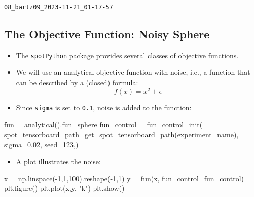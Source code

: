 \documentclass[
  letterpaper,
  DIV=11,
  numbers=noendperiod]{scrreprt}
\newenvironment{Shaded}{\begin{snugshade}}{\end{snugshade}}
\newcommand{\DecValTok}[1]{\textcolor[rgb]{0.68,0.00,0.00}{#1}}
\newcommand{\FloatTok}[1]{\textcolor[rgb]{0.68,0.00,0.00}{#1}}
\newcommand{\NormalTok}[1]{\textcolor[rgb]{0.00,0.23,0.31}{#1}}
\newcommand{\OperatorTok}[1]{\textcolor[rgb]{0.37,0.37,0.37}{#1}}
\newcommand{\StringTok}[1]{\textcolor[rgb]{0.13,0.47,0.30}{#1}}
\providecommand{\tightlist}{%
  \setlength{\itemsep}{0pt}\setlength{\parskip}{0pt}}\usepackage{longtable,booktabs,array}
\begin{document}
\begin{verbatim}
08_bartz09_2023-11-21_01-17-57
\end{verbatim}

\hypertarget{the-objective-function-noisy-sphere}{%
\subsection{The Objective Function: Noisy
Sphere}\label{the-objective-function-noisy-sphere}}

\begin{itemize}
\item
  The \texttt{spotPython} package provides several classes of objective
  functions.
\item
  We will use an analytical objective function with noise, i.e., a
  function that can be described by a (closed) formula:
  \[f(x) = x^2 + \epsilon\]
\item
  Since \texttt{sigma} is set to \texttt{0.1}, noise is added to the
  function:
\end{itemize}

\begin{Shaded}
\begin{Highlighting}[]
\NormalTok{fun }\OperatorTok{=}\NormalTok{ analytical().fun\_sphere}
\NormalTok{fun\_control }\OperatorTok{=}\NormalTok{ fun\_control\_init(}
\NormalTok{    spot\_tensorboard\_path}\OperatorTok{=}\NormalTok{get\_spot\_tensorboard\_path(experiment\_name),}
\NormalTok{    sigma}\OperatorTok{=}\FloatTok{0.02}\NormalTok{,}
\NormalTok{    seed}\OperatorTok{=}\DecValTok{123}\NormalTok{,)}
\end{Highlighting}
\end{Shaded}

\begin{itemize}
\tightlist
\item
  A plot illustrates the noise:
\end{itemize}

\begin{Shaded}
\begin{Highlighting}[]
\NormalTok{x }\OperatorTok{=}\NormalTok{ np.linspace(}\OperatorTok{{-}}\DecValTok{1}\NormalTok{,}\DecValTok{1}\NormalTok{,}\DecValTok{100}\NormalTok{).reshape(}\OperatorTok{{-}}\DecValTok{1}\NormalTok{,}\DecValTok{1}\NormalTok{)}
\NormalTok{y }\OperatorTok{=}\NormalTok{ fun(x, fun\_control}\OperatorTok{=}\NormalTok{fun\_control)}
\NormalTok{plt.figure()}
\NormalTok{plt.plot(x,y, }\StringTok{"k"}\NormalTok{)}
\NormalTok{plt.show()}
\end{Highlighting}
\end{Shaded}
\end{document}
